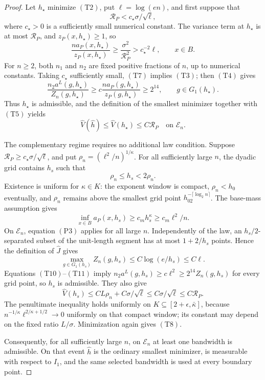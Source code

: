 \documentclass{article}
\begin{document}
\begin{proof}
Let \(h_\star\) minimize \((\mathrm{T2})\), put
\(\ell=\log(en)\), and first suppose that
\[
 \mathcal R_P<c_\star\sigma/\sqrt\ell,
 \tag{T6}
\]
where \(c_\star>0\) is a sufficiently small numerical constant.  The
variance term at \(h_\star\) is at most \(\mathcal R_P\), and
\(z_P(x,h_\star)\geq1\), so
\[
 \frac{na_P(x,h_\star)}{z_P(x,h_\star)}
 \geq\frac{\sigma^2}{\mathcal R_P^2}
 >c_\star^{-2}\ell,
 \qquad x\in B.
 \tag{T7}
\]
For \(n\geq2\), both \(n_1\) and \(n_2\) are fixed positive fractions of
\(n\), up to numerical constants.  Taking \(c_\star\) sufficiently small,
\((\mathrm{T7})\) implies \((\mathrm{T3})\); then \((\mathrm{T4})\) gives
\[
 \frac{n_2a^L(g,h_\star)}{Z_n(g,h_\star)}
 \geq c\frac{na_P(g,h_\star)}{z_P(g,h_\star)}
 \geq2^{14},\qquad g\in G_1(h_\star).
\]
Thus \(h_\star\) is admissible, and the definition of the smallest
minimizer together with \((\mathrm{T5})\) yields
\[
 \widehat V(\widehat h)\leq\widehat V(h_\star)
 \leq C\mathcal R_P
 \quad\text{on }\mathcal E_n.
 \tag{T8}
\]

The complementary regime requires no additional law condition.  Suppose
\(\mathcal R_P\geq c_\star\sigma/\sqrt\ell\), and put
\(\rho_n=(\ell^2/n)^{1/\kappa}\).  For all sufficiently large \(n\), the
dyadic grid contains \(h_s\) such that
\[
 \rho_n\leq h_s<2\rho_n.
 \tag{T9}
\]
Existence is uniform for \(\kappa\in K\): the exponent window is compact,
\(\rho_n<h_0\) eventually, and \(\rho_n\) remains above the smallest grid
point \(h_02^{-\lceil\log_2n\rceil}\).  The base-mass assumption gives
\[
 \inf_{x\in B}a_P(x,h_s)\geq c_mh_s^\kappa
 \geq c_m\ell^2/n.
 \tag{T10}
\]
On \(\mathcal E_n\), equation \((\mathrm{P3})\) applies for all large
\(n\).  Independently of the law, an \(h_s/2\)-separated subset of the
unit-length segment has at most \(1+2/h_s\) points.  Hence the definition of
\(\widehat J\) gives
\[
 \max_{g\in G_1(h_s)}Z_n(g,h_s)
 \leq C\log(e/h_s)\leq C\ell.
 \tag{T11}
\]
Equations \((\mathrm{T10})\)--\((\mathrm{T11})\) imply
\(n_2a^L(g,h_s)\geq c\ell^2\geq2^{14}Z_n(g,h_s)\) for every grid point,
so \(h_s\) is admissible.  They also give
\[
 \widehat V(h_s)
 \leq CL\rho_n+C\sigma/\sqrt\ell
 \leq C\sigma/\sqrt\ell
 \leq C\mathcal R_P.
 \tag{T12}
\]
The penultimate inequality holds uniformly on
\(K\subseteq[2+\epsilon,\bar\kappa]\), because
\(n^{-1/\kappa}\ell^{2/\kappa+1/2}\to0\) uniformly on that compact window;
its constant may depend on the fixed ratio \(L/\sigma\).  Minimization again
gives \((\mathrm{T8})\).

Consequently, for all sufficiently large \(n\), on \(\mathcal E_n\) at
least one bandwidth is admissible.  On that event \(\widehat h\) is the
ordinary smallest minimizer, is measurable with respect to \(I_1\), and the
same selected bandwidth is used at every boundary point.


\end{proof}
\end{document}
